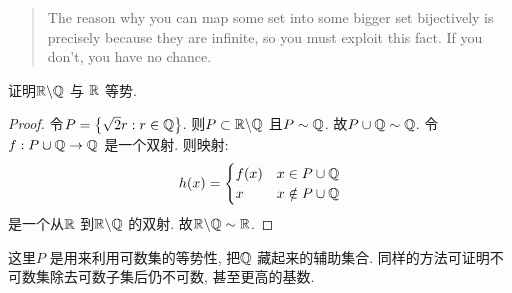 \begin{quote}
    The reason why you can map some set into some bigger
    set bijectively is precisely because they are infinite,
    so you must exploit this fact. If you don't, you have no chance.
\end{quote}

\begin{problem}
    证明\(\mathbb{R}\backslash \mathbb{Q} \) 与 \(\mathbb{R}\) 等势.
\end{problem}

\begin{proof}
    令\(P=\left\{ \sqrt{2}r:r \in \mathbb{Q} \right\} \).
    则\(P \subset \mathbb{R}\backslash \mathbb{Q}\) 且\(P\sim
    \mathbb{Q}\). 故\(P\cup \mathbb{Q}\sim \mathbb{Q}\). 令\(f: P\cup \mathbb{Q} \to \mathbb{Q}\) 是一个双射.
    则映射: \[
        h(x) =
        \begin{cases}
            f(x) & x\in P\cup \mathbb{Q} \\
            x & x \notin P\cup \mathbb{Q}
        \end{cases}
    \]
    是一个从\(\mathbb{R}\) 到\(\mathbb{R}\backslash \mathbb{Q}\) 的双射. 故\(\mathbb{R}\backslash
    \mathbb{Q} \sim \mathbb{R}\).
\end{proof}

这里\(P\) 是用来利用可数集的等势性, 把\(\mathbb{Q}\) 藏起来的辅助集合.
同样的方法可证明不可数集除去可数子集后仍不可数, 甚至更高的基数.







